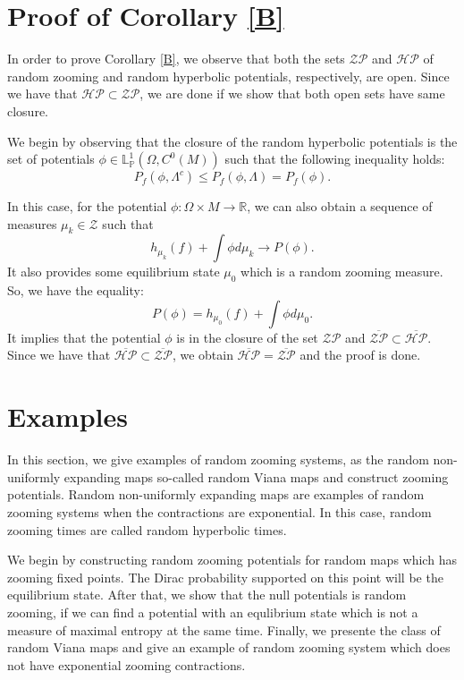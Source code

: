 \documentclass[12pt,a4paper]{amsart}
\theoremstyle{plain}
\begin{document}
	
	\section{Proof of Corollary \ref{B}}
	
	In order to prove Corollary \ref{B}, we observe that both the sets $\mathcal{ZP}$ and $\mathcal{HP}$ of random zooming and random hyperbolic potentials, respectively, are open. Since we have that $\mathcal{HP} \subset \mathcal{ZP}$, we are done if we show that both open sets have same closure.
	
	We begin by observing that the closure of the random hyperbolic potentials is the set of potentials $\phi  \in \mathbb{L}^{1}_{\mathbb{P}}(\Omega,C^0(M))$ such that the following inequality holds:
	\begin{equation}
		\label{equationradhyperpoten}
		P_{f}(\phi,\Lambda^{c}) \leq P_{f}(\phi,\Lambda) = P_{f}(\phi).
	\end{equation} 
	
	In this case, for the potential $\phi : \Omega \times M \to \mathbb{R}$, we can also obtain a sequence of measures $\mu_{k} \in \mathcal{Z}$ such that
	\[
	h_{\mu_{k}}(f) + \int \phi d\mu_{k} \to P(\phi).
	\]
	It also provides some equilibrium state $\mu_{0}$ which is a random zooming measure. So, we have the equality:
	\[
	P(\phi) = h_{\mu_{0}}(f) + \int \phi d\mu_{0}.
	\]
	It implies that the potential $\phi$ is in the closure of the set $\mathcal{ZP}$ and $\overline{\mathcal{ZP}} \subset \overline{\mathcal{HP}}$. Since we have that $\overline{\mathcal{HP}} \subset \overline{\mathcal{ZP}}$, we obtain $\overline{\mathcal{HP}} = \overline{\mathcal{ZP}}$ and the proof is done.
	
	\section{Examples}
	
	In this section, we give examples of random zooming systems, as the random non-uniformly expanding maps so-called random Viana maps and construct zooming potentials. Random non-uniformly expanding maps are examples of random zooming systems when the contractions are exponential. In this case, random zooming times are called random hyperbolic times.
	
	We begin by constructing random zooming potentials for random maps which has zooming fixed points. The Dirac probability supported on this point will be the equilibrium state. After that, we show that the null potentials is random zooming, if we can find a potential with an equlibrium state which is not a measure of maximal entropy at the same time. Finally, we presente the class of random Viana maps and give an example of random zooming system which does not have exponential zooming contractions. 
	
\end{document}
